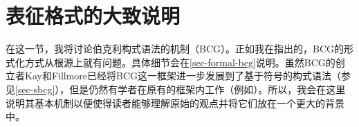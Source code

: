 
\section{表征格式的大致说明}

\largerpage
在这一节，我将讨论伯克利构式语法的机制（BCG）。正如我在指出的，BCG的形式化方式从根源上就有问题。具体细节会在\ref{sec-formal-bcg}说明。虽然BCG的创立者Kay和Fillmore已经将BCG这一框架进一步发展到了基于符号的构式语法（参见\ref{sec-sbcg}），但是仍然有学者在原有的框架内工作（例如\citealp{Fried2013a-u}）。所以，我会在这里说明其基本机制以便使得读者能够理解原始的观点并将它们放在一个更大的背景中。


